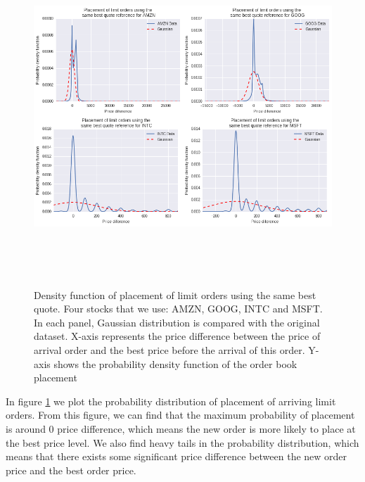 \begin{figure}[hbtp]
	\begin{center}
		\includegraphics[width=6in, height=5in]{figures/placement.png}
	\end{center}
	\caption{Density function of placement of limit orders using the same best quote. Four stocks that we use:  AMZN, GOOG, INTC and MSFT. In each panel, Gaussian distribution is compared with the original dataset. X-axis represents the price difference between the price of arrival order and the best price before the arrival of this order. Y-axis shows the probability density function of the order book placement} \label{fig: placement}
\end{figure}

In figure \ref{fig: placement} we plot the probability distribution of placement of arriving limit orders. From this figure,  we can find that the maximum probability of placement is around 0 price difference,  which means the new order is more likely to place at the best price level. We also find heavy tails in the probability distribution,  which means that there exists some significant price difference between the new order price and the best order price.  


